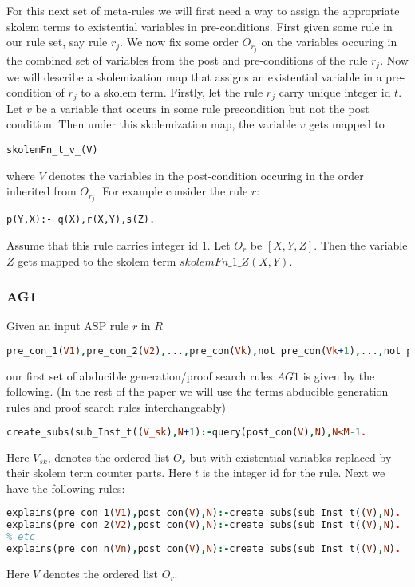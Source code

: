 \documentclass[sigconf]{acmart}
\begin{document}
For this next set of meta-rules we will first need a way to assign the appropriate skolem terms to existential variables in pre-conditions. First given some rule in our rule set, say rule $r_{j}$. We now fix some order $O_{r_{j}}$ on the variables occuring in the combined set of variables from the post and pre-conditions of the rule $r_{j}$. Now we will describe a skolemization map that assigns an existential variable in a pre-condition of $r_{j}$ to a skolem term. Firstly, let the rule $r_{j}$ 
carry unique integer id $t$. Let $v$ be a variable that occurs in some rule precondition but not the post condition. Then under this skolemization map, the variable $v$ gets mapped to 
\begin{verbatim}
skolemFn_t_v_(V)    
\end{verbatim}
where $V$ denotes the variables in the post-condition occuring in the order inherited from $O_{r_{j}}$. For example consider the rule $r$: 
\begin{verbatim}
p(Y,X):- q(X),r(X,Y),s(Z).    
\end{verbatim} 
Assume that this rule carries integer id $1$. Let $O_{r}$ be $[X,Y,Z]$. Then the variable $Z$ gets mapped to the skolem term $skolemFn\_1\_Z(X,Y)$.

\subsubsection{AG1}
Given an input ASP rule $r$ in $R$
\begin{lstlisting}[language=Prolog,frame=none]
pre_con_1(V1),pre_con_2(V2),...,pre_con(Vk),not pre_con(Vk+1),...,not pre_con_n(Vn) -> post_con(V).
\end{lstlisting}
our first set of abducible generation/proof search rules $AG1$ is given by the following. (In the rest of the paper we will use the terms abducible generation rules and proof search rules interchangeably) 
\begin{lstlisting}[language=Prolog,frame=none]
create_subs(sub_Inst_t((V_sk),N+1):-query(post_con(V),N),N<M-1.
\end{lstlisting}
Here $V_{sk}$, denotes the ordered list $O_{r}$ but with existential variables replaced by their skolem term counter parts. Here $t$ is the integer id for the rule.
Next we have the following rules:
\begin{lstlisting}[language=Prolog,frame=none]
explains(pre_con_1(V1),post_con(V),N):-create_subs(sub_Inst_t((V),N).
explains(pre_con_2(V2),post_con(V),N):-create_subs(sub_Inst_t((V),N).
% etc
explains(pre_con_n(Vn),post_con(V),N):-create_subs(sub_Inst_t((V),N).
\end{lstlisting}
Here $V$ denotes the ordered list $O_{r}$.
\end{document}
